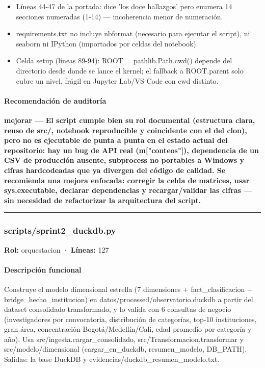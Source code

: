 \begin{tcolorbox}[riesgo]
\begin{itemize}
\begin{lstlisting}
Validación documentada de calidad de los datos del padrón de investigadores
reconocidos. La decisión metodológica adoptada se documenta de forma explícita
para que cualquier auditor pueda reproducirla y discutirla.
[...]
\end{lstlisting}

  \item Líneas 44-47 de la portada: dice 'los doce hallazgos' pero enumera 14 secciones numeradas (1-14) --- incoherencia menor de numeración.
  \item requirements.txt no incluye nbformat (necesario para ejecutar el script), ni seaborn ni IPython (importados por celdas del notebook).
  \item Celda setup (líneas 89-94): ROOT = pathlib.Path.cwd() depende del directorio desde donde se lance el kernel; el fallback a ROOT.parent solo cubre un nivel, frágil en Jupyter Lab/VS Code con cwd distinto.
\end{itemize}
\end{tcolorbox}

\paragraph{Recomendación de auditoría}
\textbf{mejorar --- El script cumple bien su rol documental (estructura clara, reuso de src/, notebook reproducible y coincidente con el del clon), pero no es ejecutable de punta a punta en el estado actual del repositorio: hay un bug de API real (m["conteos"]), dependencia de un CSV de producción ausente, subprocess no portables a Windows y cifras hardcodeadas que ya divergen del código de calidad. Se recomienda una mejora enfocada: corregir la celda de matrices, usar sys.executable, declarar dependencias y recargar/validar las cifras --- sin necesidad de refactorizar la arquitectura del script.}

\medskip
\hrule

\subsubsection{scripts/sprint2\_duckdb.py}
\textbf{Rol:} orquestacion · \textbf{Líneas:} 127

\paragraph{Descripción funcional}
Construye el modelo dimensional estrella (7 dimensiones + fact\_clasificacion + bridge\_hecho\_institucion) en datos/processed/observatorio.duckdb a partir del dataset consolidado transformado, y lo valida con 6 consultas de negocio (investigadores por convocatoria, distribución de categorías, top-10 instituciones, gran área, concentración Bogotá/Medellín/Cali, edad promedio por categoría y año). Usa src/ingesta.cargar\_consolidado, src/Transformacion.transformar y src/modelo/dimensional (cargar\_en\_duckdb, resumen\_modelo, DB\_PATH). Salidas: la base DuckDB y evidencias/duckdb\_resumen\_modelo.txt.

